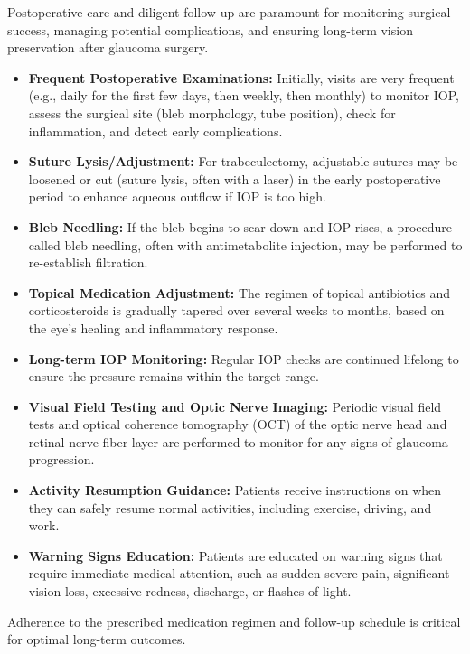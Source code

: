 Postoperative care and diligent follow-up are paramount for monitoring surgical success, managing potential complications, and ensuring long-term vision preservation after glaucoma surgery.

\begin{itemize}
  \item \textbf{Frequent Postoperative Examinations:} Initially, visits are very frequent (e.g., daily for the first few days, then weekly, then monthly) to monitor IOP, assess the surgical site (bleb morphology, tube position), check for inflammation, and detect early complications.
  \item \textbf{Suture Lysis/Adjustment:} For trabeculectomy, adjustable sutures may be loosened or cut (suture lysis, often with a laser) in the early postoperative period to enhance aqueous outflow if IOP is too high.
  \item \textbf{Bleb Needling:} If the bleb begins to scar down and IOP rises, a procedure called bleb needling, often with antimetabolite injection, may be performed to re-establish filtration.
  \item \textbf{Topical Medication Adjustment:} The regimen of topical antibiotics and corticosteroids is gradually tapered over several weeks to months, based on the eye's healing and inflammatory response.
  \item \textbf{Long-term IOP Monitoring:} Regular IOP checks are continued lifelong to ensure the pressure remains within the target range.
  \item \textbf{Visual Field Testing and Optic Nerve Imaging:} Periodic visual field tests and optical coherence tomography (OCT) of the optic nerve head and retinal nerve fiber layer are performed to monitor for any signs of glaucoma progression.
  \item \textbf{Activity Resumption Guidance:} Patients receive instructions on when they can safely resume normal activities, including exercise, driving, and work.
  \item \textbf{Warning Signs Education:} Patients are educated on warning signs that require immediate medical attention, such as sudden severe pain, significant vision loss, excessive redness, discharge, or flashes of light.
\end{itemize}
Adherence to the prescribed medication regimen and follow-up schedule is critical for optimal long-term outcomes.

